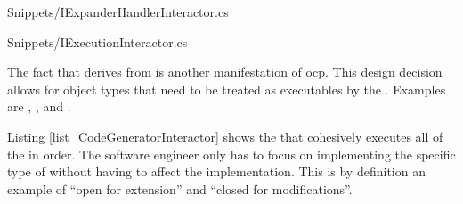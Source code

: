 
    {Snippets/IExpanderHandlerInteractor.cs}


    {Snippets/IExecutionInteractor.cs}

The fact that  derives from
 is another manifestation of \gls{ocp}. This
design decision allows for object types that need to be treated as executables by the
. Examples are
,
,
 and
. 

Listing \ref{list_CodeGeneratorInteractor} shows the
 that cohesively executes all of the
 in order. The software engineer only has to focus on
implementing the specific type of  without having to
affect the implementation. This is by definition an example of \enquote{open for
extension} and \enquote{closed for modifications}.